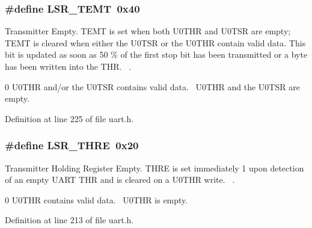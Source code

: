 \subsubsection[{\texorpdfstring{L\+S\+R\+\_\+\+T\+E\+MT}{LSR_TEMT}}]{\setlength{\rightskip}{0pt plus 5cm}\#define L\+S\+R\+\_\+\+T\+E\+MT~0x40}\hypertarget{group___r_e_g_i_s_t_r_o___l_s_r_ga7dfceb10f5c20011b9410e2efb39163d}{}\label{group___r_e_g_i_s_t_r_o___l_s_r_ga7dfceb10f5c20011b9410e2efb39163d}


Transmitter Empty. T\+E\+MT is set when both U0\+T\+HR and U0\+T\+SR are empty; T\+E\+MT is cleared when either the U0\+T\+SR or the U0\+T\+HR contain valid data. This bit is updated as soon as 50 \% of the first stop bit has been transmitted or a byte has been written into the T\+HR.~\newline
. 

0 U0\+T\+HR and/or the U0\+T\+SR contains valid data.~ U0\+T\+HR and the U0\+T\+SR are empty.~\newline


Definition at line 225 of file uart.\+h.

\subsubsection[{\texorpdfstring{L\+S\+R\+\_\+\+T\+H\+RE}{LSR_THRE}}]{\setlength{\rightskip}{0pt plus 5cm}\#define L\+S\+R\+\_\+\+T\+H\+RE~0x20}\hypertarget{group___r_e_g_i_s_t_r_o___l_s_r_ga8c1a828f5fe296a9c1668cf3e72c00c1}{}\label{group___r_e_g_i_s_t_r_o___l_s_r_ga8c1a828f5fe296a9c1668cf3e72c00c1}


Transmitter Holding Register Empty. T\+H\+RE is set immediately 1 upon detection of an empty U\+A\+RT T\+HR and is cleared on a U0\+T\+HR write.~\newline
. 

0 U0\+T\+HR contains valid data.~ U0\+T\+HR is empty.~\newline


Definition at line 213 of file uart.\+h.

